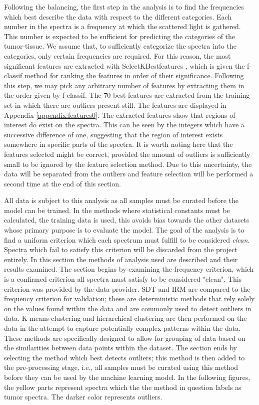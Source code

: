Following the balancing, the first step in the analysis is to find the frequencies which best describe the data with respect to the different categories. Each number in the spectra is a frequency at which the scattered light is gathered. This number is expected to be sufficient for predicting the categories of the tumor-tissue. We assume that, to sufficiently categorize the spectra into the categories, only certain frequencies are required. For this reason, the most significant features are extracted with SelectKBestfeatures \cite{scikit}, which is given the f-classif method for ranking the features in order of their significance. Following this step, we may pick any arbitrary number of features by extracting them in the order given by f-classif. The $70$ best features are extracted from the training set in which there are outliers present still. The features are displayed in Appendix \ref{appendix:features0}. The extracted features show that regions of interest do exist on the spectra. This can be seen by the integers which have a successive difference of one, suggesting that the region of interest exists somewhere in specific parts of the spectra. It is worth noting here that the features selected might be correct, provided the amount of outliers is sufficiently small to be ignored by the feature selection method. Due to this uncertainty, the data will be separated from the outliers and feature selection will be performed a second time at the end of this section.

All data is subject to this analysis as all samples must be curated before the model can be trained. In the methods where statistical constants must be calculated, the training data is used, this avoids bias towards the other datasets whose primary purpose is to evaluate the model. The goal of the analysis is to find a uniform criterion which each spectrum must fulfill to be considered \textit{clean}. Spectra which fail to satisfy this criterion will be discarded from the project entirely. In this section the methods of analysis used are described and their results examined. The section begins by examining the frequency criterion, which is a confirmed criterion all spectra must satisfy to be considered "clean". This criterion was provided by the data provider. SDT and IRM are compared to the frequency criterion for validation; these are deterministic methods that rely solely on the values found within the data and are commonly used to detect outliers in data. K-means clustering and hierarchical clustering are then performed on the data in the attempt to capture potentially complex patterns within the data. These methods are specifically designed to allow for grouping of data based on the similarities between data points within the dataset. The section ends by selecting the method which best detects outliers; this method is then added to the pre-processing stage, i.e., all samples must be curated using this method before they can be used by the machine learning model. In the following figures, the yellow parts represent spectra which the the method in question labels as tumor spectra. The darker color represents outliers.

